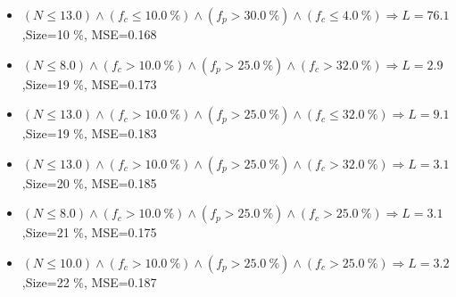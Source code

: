 \documentclass[numbered]{CSL}
\begin{document}
\begin{itemize}
\item $(N \leq 13.0) \land (f_c \leq 10.0~\%) \land (f_p > 30.0~\%) \land (f_c \leq 4.0~\%) \Rightarrow L = 76.1$,\hfill Size=10 \%, MSE=0.168
\item $(N \leq 8.0) \land (f_c > 10.0~\%) \land (f_p > 25.0~\%) \land (f_c > 32.0~\%) \Rightarrow L = 2.9$,\hfill Size=19 \%, MSE=0.173
\item $(N \leq 13.0) \land (f_c > 10.0~\%) \land (f_p > 25.0~\%) \land (f_c \leq 32.0~\%) \Rightarrow L = 9.1$,\hfill Size=19 \%, MSE=0.183
\item $(N \leq 13.0) \land (f_c > 10.0~\%) \land (f_p > 25.0~\%) \land (f_c > 32.0~\%) \Rightarrow L = 3.1$,\hfill Size=20 \%, MSE=0.185
\item $(N \leq 8.0) \land (f_c > 10.0~\%) \land (f_p > 25.0~\%) \land (f_c > 25.0~\%) \Rightarrow L = 3.1$,\hfill Size=21 \%, MSE=0.175
\item $(N \leq 10.0) \land (f_c > 10.0~\%) \land (f_p > 25.0~\%) \land (f_c > 25.0~\%) \Rightarrow L = 3.2$,\hfill Size=22 \%, MSE=0.187
\end{itemize}
\end{document}
